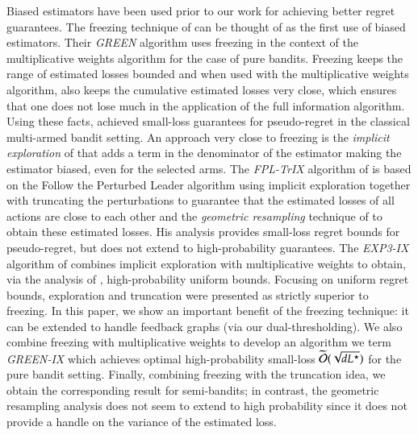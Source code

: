 Biased estimators have been used prior to our work for achieving better regret guarantees. The freezing technique of \cite{Allenberg2006} can be thought of as the first use of biased estimators.  Their \emph{GREEN} algorithm uses freezing in the context of the multiplicative weights algorithm for the case of pure bandits. Freezing keeps the range of estimated losses bounded and when used with the multiplicative weights algorithm, also keeps the cumulative estimated losses very close, which ensures that one does not lose much in the application of the full information algorithm. Using these facts, \cite{Allenberg2006} achieved small-loss guarantees for  pseudo-regret in the classical multi-armed bandit setting. 
An approach very close to freezing is the \emph{implicit exploration} of \cite{Kock2014EfficientLB} that adds a term in the denominator of the estimator making the estimator biased, even for the selected arms. 
The \emph{FPL-TrIX} algorithm of \cite{Neu15_semibandits} 
is based on the Follow the Perturbed Leader algorithm using implicit exploration together with truncating the perturbations to  guarantee that the estimated losses of all actions are close to each other and the \emph{geometric resampling} technique of \cite{NeuB13} to obtain these estimated losses. His analysis provides small-loss regret bounds for pseudo-regret, but does not extend to high-probability guarantees. The \emph{EXP3-IX} algorithm of  \cite{Kock2014EfficientLB}combines implicit exploration with multiplicative weights to obtain, via the analysis of \cite{Neu2015_implicit}, high-probability uniform bounds. Focusing on uniform regret bounds, exploration and truncation were presented as strictly superior to freezing. In this paper, we show an important benefit of the freezing technique: it can be extended to handle feedback graphs (via our dual-thresholding).
We also combine freezing with multiplicative weights to develop an algorithm we term \emph{GREEN-IX} which achieves optimal high-probability small-loss
$\widetilde{\mathcal{O}}(\sqrt{d L^{\star}})$ for the pure bandit setting. Finally, combining freezing with the truncation idea, we obtain the corresponding result for semi-bandits; in contrast, the geometric resampling analysis does not seem to extend to high probability since it does not provide a handle on the variance of the estimated loss. 